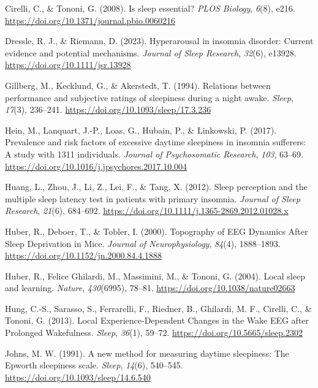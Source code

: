 \documentclass[
]{article}
\newlength{\cslhangindent}
\newenvironment{CSLReferences}[2] %
 {\begin{list}{}{%
  \setlength{\itemindent}{0pt}
  \setlength{\leftmargin}{0pt}
  \setlength{\parsep}{0pt}
  \ifodd #1
   \setlength{\leftmargin}{\cslhangindent}
   \setlength{\itemindent}{-1\cslhangindent}
  \fi
  \setlength{\itemsep}{#2\baselineskip}}}
 {\end{list}}
\begin{document}
\begin{CSLReferences}{1}{0}
Cirelli, C., \& Tononi, G. (2008). Is sleep essential? \emph{PLOS
Biology}, \emph{6}(8), e216.
\url{https://doi.org/10.1371/journal.pbio.0060216}

Dressle, R. J., \& Riemann, D. (2023). Hyperarousal in insomnia
disorder: {Current} evidence and potential mechanisms. \emph{Journal of
Sleep Research}, \emph{32}(6), e13928.
\url{https://doi.org/10.1111/jsr.13928}

Gillberg, M., Kecklund, G., \& Akerstedt, T. (1994). Relations between
performance and subjective ratings of sleepiness during a night awake.
\emph{Sleep}, \emph{17}(3), 236--241.
\url{https://doi.org/10.1093/sleep/17.3.236}

Hein, M., Lanquart, J.-P., Loas, G., Hubain, P., \& Linkowski, P.
(2017). Prevalence and risk factors of excessive daytime sleepiness in
insomnia sufferers: {A} study with 1311 individuals. \emph{Journal of
Psychosomatic Research}, \emph{103}, 63--69.
\url{https://doi.org/10.1016/j.jpsychores.2017.10.004}

Huang, L., Zhou, J., Li, Z., Lei, F., \& Tang, X. (2012). Sleep
perception and the multiple sleep latency test in patients with primary
insomnia. \emph{Journal of Sleep Research}, \emph{21}(6), 684--692.
\url{https://doi.org/10.1111/j.1365-2869.2012.01028.x}

Huber, R., Deboer, T., \& Tobler, I. (2000). Topography of {EEG Dynamics
After Sleep Deprivation} in {Mice}. \emph{Journal of Neurophysiology},
\emph{84}(4), 1888--1893.
\url{https://doi.org/10.1152/jn.2000.84.4.1888}

Huber, R., Felice Ghilardi, M., Massimini, M., \& Tononi, G. (2004).
Local sleep and learning. \emph{Nature}, \emph{430}(6995), 78--81.
\url{https://doi.org/10.1038/nature02663}

Hung, C.-S., Sarasso, S., Ferrarelli, F., Riedner, B., Ghilardi, M. F.,
Cirelli, C., \& Tononi, G. (2013). Local {Experience-Dependent Changes}
in the {Wake EEG} after {Prolonged Wakefulness}. \emph{Sleep},
\emph{36}(1), 59--72. \url{https://doi.org/10.5665/sleep.2302}

Johns, M. W. (1991). A new method for measuring daytime sleepiness: {The
Epworth} sleepiness scale. \emph{Sleep}, \emph{14}(6), 540--545.
\url{https://doi.org/10.1093/sleep/14.6.540}


\end{CSLReferences}
\end{document}
